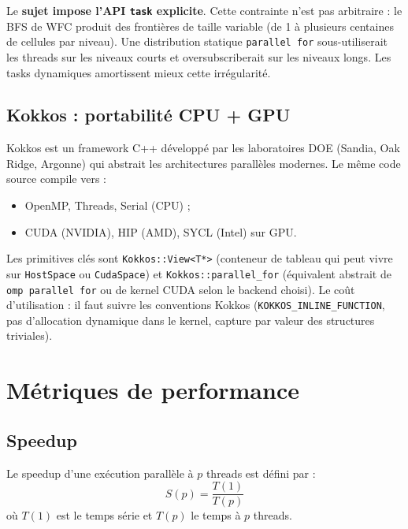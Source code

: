Le \textbf{sujet impose l'API \texttt{task} explicite}. Cette contrainte n'est pas arbitraire : le BFS de WFC produit des frontières de taille variable (de 1 à plusieurs centaines de cellules par niveau). Une distribution statique \texttt{parallel for} sous-utiliserait les threads sur les niveaux courts et oversubscriberait sur les niveaux longs. Les tasks dynamiques amortissent mieux cette irrégularité.

\subsection{Kokkos : portabilité CPU + GPU}

Kokkos \cite{kokkos2014} est un framework C++ développé par les laboratoires DOE (Sandia, Oak Ridge, Argonne) qui abstrait les architectures parallèles modernes. Le même code source compile vers :
\begin{itemize}
    \item OpenMP, Threads, Serial (CPU) ;
    \item CUDA (NVIDIA), HIP (AMD), SYCL (Intel) sur GPU.
\end{itemize}

Les primitives clés sont \texttt{Kokkos::View<T*>} (conteneur de tableau qui peut vivre sur \texttt{HostSpace} ou \texttt{CudaSpace}) et \texttt{Kokkos::parallel\_for} (équivalent abstrait de \texttt{omp parallel for} ou de kernel CUDA selon le backend choisi). Le coût d'utilisation : il faut suivre les conventions Kokkos (\texttt{KOKKOS\_INLINE\_FUNCTION}, pas d'allocation dynamique dans le kernel, capture par valeur des structures triviales).

\section{Métriques de performance}
\label{sec:prelim:metriques}

\subsection{Speedup}

\begin{definition}[Speedup]
Le speedup d'une exécution parallèle à $p$ threads est défini par :
\[
S(p) = \frac{T(1)}{T(p)}
\]
où $T(1)$ est le temps série et $T(p)$ le temps à $p$ threads.
\end{definition}

